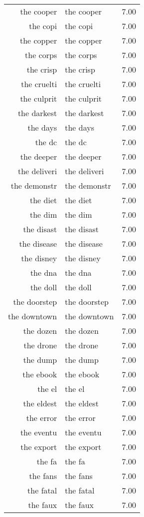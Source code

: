 \begin{table}[ht]
\begin{tabular}{rlr}
  the cooper & the cooper & 7.00 \\ 
  the copi & the copi & 7.00 \\ 
  the copper & the copper & 7.00 \\ 
  the corps & the corps & 7.00 \\ 
  the crisp & the crisp & 7.00 \\ 
  the cruelti & the cruelti & 7.00 \\ 
  the culprit & the culprit & 7.00 \\ 
  the darkest & the darkest & 7.00 \\ 
  the days & the days & 7.00 \\ 
  the dc & the dc & 7.00 \\ 
  the deeper & the deeper & 7.00 \\ 
  the deliveri & the deliveri & 7.00 \\ 
  the demonstr & the demonstr & 7.00 \\ 
  the diet & the diet & 7.00 \\ 
  the dim & the dim & 7.00 \\ 
  the disast & the disast & 7.00 \\ 
  the disease & the disease & 7.00 \\ 
  the disney & the disney & 7.00 \\ 
  the dna & the dna & 7.00 \\ 
  the doll & the doll & 7.00 \\ 
  the doorstep & the doorstep & 7.00 \\ 
  the downtown & the downtown & 7.00 \\ 
  the dozen & the dozen & 7.00 \\ 
  the drone & the drone & 7.00 \\ 
  the dump & the dump & 7.00 \\ 
  the ebook & the ebook & 7.00 \\ 
  the el & the el & 7.00 \\ 
  the eldest & the eldest & 7.00 \\ 
  the error & the error & 7.00 \\ 
  the eventu & the eventu & 7.00 \\ 
  the export & the export & 7.00 \\ 
  the fa & the fa & 7.00 \\ 
  the fans & the fans & 7.00 \\ 
  the fatal & the fatal & 7.00 \\ 
  the faux & the faux & 7.00 \\ 

\end{tabular}
\end{table}
